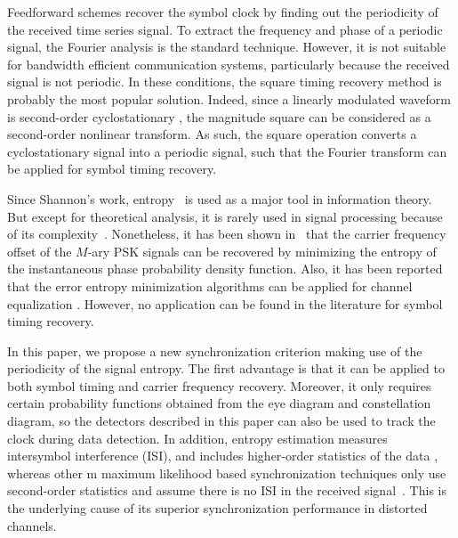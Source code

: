 \documentclass[journal,comsoc]{IEEEtran}
\begin{document}
Feedforward schemes recover the symbol clock by finding out the periodicity of the received time series signal.
To extract the frequency and phase of a periodic signal,
the Fourier analysis is the standard technique.
However, it is not suitable for bandwidth efficient communication systems, 
particularly because the received signal is not periodic.
In these conditions, the square timing recovery method \cite{Oerder1988} is probably the most popular solution.
Indeed, since a linearly modulated waveform is second-order cyclostationary \cite{Gini1998}, the magnitude square can be considered as a second-order nonlinear transform.
As such, the square operation converts a cyclostationary signal into a periodic signal, such that the Fourier transform can be applied for symbol timing recovery.

Since Shannon's work, entropy~\cite{Shannon1948} is used as a major tool in information theory. 
But except for theoretical analysis, it is rarely used in signal processing because of its complexity~\cite{Bercher2000}.
Nonetheless, it has been shown in~\cite{Pedzisz2006} that the carrier frequency offset of the \(M\)-ary PSK signals can be recovered by minimizing the entropy of the instantaneous phase probability density function.
Also, it has been reported that the error entropy minimization algorithms can be applied for channel equalization \cite{Santamaria2002}. 
However, no application can be found in the literature for symbol timing recovery.

In this paper, we propose a new synchronization criterion making use of the periodicity of the signal entropy.
The first advantage is that it can be applied to both symbol timing and carrier frequency recovery. 
Moreover, it only requires certain probability functions obtained from the eye diagram and constellation diagram, so the detectors described in this paper can also be used to track the clock during data detection. 
In addition, entropy estimation measures intersymbol interference (ISI), and includes higher-order statistics of the data \cite{Santamaria2002}, whereas other m maximum likelihood based synchronization techniques only use second-order statistics and assume there is no ISI in the received signal~\cite{meyr1997digital}.
This is the underlying cause of its superior synchronization performance in distorted channels.
\end{document}
